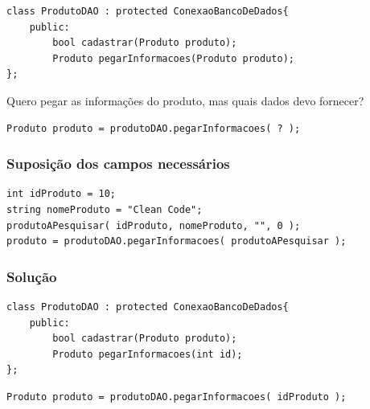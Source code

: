 \begin{frame}[fragile]

	\begin{listing}[H]
		\begin{verbatim}
class ProdutoDAO : protected ConexaoBancoDeDados{
	public:
		bool cadastrar(Produto produto);
		Produto pegarInformacoes(Produto produto);
};
		\end{verbatim}
	\end{listing}

\end{frame}

\begin{frame}[fragile]

	{\Huge Quero pegar as informações do produto, mas quais dados devo fornecer?}

	\begin{listing}[H]
		\begin{verbatim}
Produto produto = produtoDAO.pegarInformacoes( ? );
		\end{verbatim}
	\end{listing}

\end{frame}

\begin{frame}[fragile]
	\frametitle{Suposição dos campos necessários}

	\begin{listing}[H]
		\begin{verbatim}
int idProduto = 10;
string nomeProduto = "Clean Code";
produtoAPesquisar( idProduto, nomeProduto, "", 0 );
produto = produtoDAO.pegarInformacoes( produtoAPesquisar );
		\end{verbatim}
	\end{listing}

\end{frame}

\begin{frame}[fragile]
	\frametitle{Solução}

	\begin{listing}[H]
		\begin{verbatim}
class ProdutoDAO : protected ConexaoBancoDeDados{
	public:
		bool cadastrar(Produto produto);
		Produto pegarInformacoes(int id);
};
		\end{verbatim}
	\end{listing}

	\begin{listing}[H]
		\begin{verbatim}
Produto produto = produtoDAO.pegarInformacoes( idProduto );
		\end{verbatim}
	\end{listing}

\end{frame}

